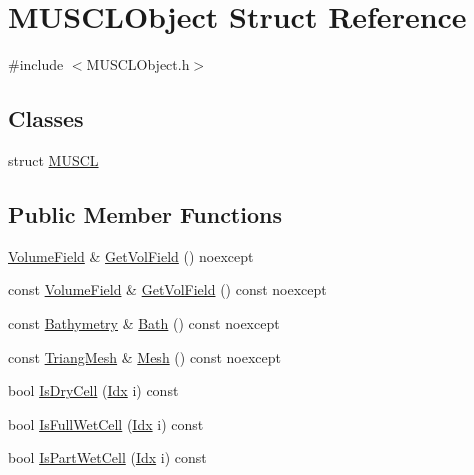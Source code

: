 \hypertarget{structMUSCLObject}{}\section{M\+U\+S\+C\+L\+Object Struct Reference}
\label{structMUSCLObject}


{\ttfamily \#include $<$M\+U\+S\+C\+L\+Object.\+h$>$}

\subsection*{Classes}
\begin{DoxyCompactItemize}
\item 
struct \hyperlink{structMUSCLObject_1_1MUSCL}{M\+U\+S\+CL}
\end{DoxyCompactItemize}
\subsection*{Public Member Functions}
\begin{DoxyCompactItemize}
\item 
\hyperlink{ValueField_8h_a329043a10c46a8722ea79ba24fe40f97}{Volume\+Field} \& \hyperlink{structMUSCLObject_a9ba24ae90a94c7d80f651ce26053b303}{Get\+Vol\+Field} () noexcept
\item 
const \hyperlink{ValueField_8h_a329043a10c46a8722ea79ba24fe40f97}{Volume\+Field} \& \hyperlink{structMUSCLObject_a8b96302a64cceadec4e0126b68649814}{Get\+Vol\+Field} () const noexcept
\item 
const \hyperlink{structBathymetry}{Bathymetry} \& \hyperlink{structMUSCLObject_a4746396c5f8cb793b81ed847e372c71c}{Bath} () const noexcept
\item 
const \hyperlink{structTriangMesh}{Triang\+Mesh} \& \hyperlink{structMUSCLObject_a5761f77d8e701b065f3744cb56cae12a}{Mesh} () const noexcept
\item 
bool \hyperlink{structMUSCLObject_af28aa29d618bb7a6f18786979e073985}{Is\+Dry\+Cell} (\hyperlink{Includes_8h_ae78891cd308078a2f5f9e7193065c805}{Idx} i) const
\item 
bool \hyperlink{structMUSCLObject_ab5ab3fb897dba03533436f88267be94e}{Is\+Full\+Wet\+Cell} (\hyperlink{Includes_8h_ae78891cd308078a2f5f9e7193065c805}{Idx} i) const
\item 
bool \hyperlink{structMUSCLObject_a13ae627633d480bdfded994053dad157}{Is\+Part\+Wet\+Cell} (\hyperlink{Includes_8h_ae78891cd308078a2f5f9e7193065c805}{Idx} i) const
\end{DoxyCompactItemize}
